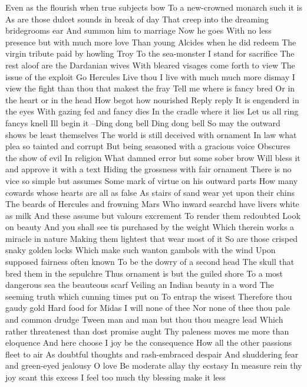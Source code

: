 Even as the flourish when true subjects bow 
To a new-crowned monarch such it is 
As are those dulcet sounds in break of day 
That creep into the dreaming bridegrooms ear 
And summon him to marriage Now he goes 
With no less presence but with much more love 
Than young Alcides when he did redeem 
The virgin tribute paid by howling Troy 
To the sea-monster I stand for sacrifice 
The rest aloof are the Dardanian wives 
With bleared visages come forth to view 
The issue of the exploit Go Hercules 
Live thou I live with much much more dismay 
I view the fight than thou that makest the fray 
Tell me where is fancy bred 
Or in the heart or in the head 
How begot how nourished 
Reply reply 
It is engenderd in the eyes 
With gazing fed and fancy dies 
In the cradle where it lies 
Let us all ring fancys knell 
Ill begin it --Ding dong bell 
Ding dong bell 
So may the outward shows be least themselves 
The world is still deceived with ornament 
In law what plea so tainted and corrupt 
But being seasoned with a gracious voice 
Obscures the show of evil In religion 
What damned error but some sober brow 
Will bless it and approve it with a text 
Hiding the grossness with fair ornament 
There is no vice so simple but assumes 
Some mark of virtue on his outward parts 
How many cowards whose hearts are all as false 
As stairs of sand wear yet upon their chins 
The beards of Hercules and frowning Mars 
Who inward searchd have livers white as milk 
And these assume but valours excrement 
To render them redoubted Look on beauty 
And you shall see tis purchased by the weight 
Which therein works a miracle in nature 
Making them lightest that wear most of it 
So are those crisped snaky golden locks 
Which make such wanton gambols with the wind 
Upon supposed fairness often known 
To be the dowry of a second head 
The skull that bred them in the sepulchre 
Thus ornament is but the guiled shore 
To a most dangerous sea the beauteous scarf 
Veiling an Indian beauty in a word 
The seeming truth which cunning times put on 
To entrap the wisest Therefore thou gaudy gold 
Hard food for Midas I will none of thee 
Nor none of thee thou pale and common drudge 
Tween man and man but thou thou meagre lead 
Which rather threatenest than dost promise aught 
Thy paleness moves me more than eloquence 
And here choose I joy be the consequence 
How all the other passions fleet to air 
As doubtful thoughts and rash-embraced despair 
And shuddering fear and green-eyed jealousy O love 
Be moderate allay thy ecstasy 
In measure rein thy joy scant this excess 
I feel too much thy blessing make it less 
